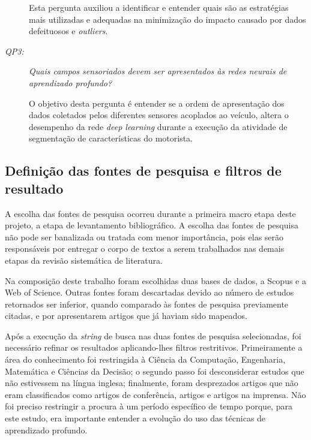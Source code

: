 \documentclass[10pt,journal,compsoc]{IEEEtran}
\begin{document}
\begin{description}
\begin{adjustwidth}{}{}
    Esta pergunta auxiliou a identificar e entender quais são as estratégias mais
    utilizadas e adequadas na minimização do impacto causado por dados defeituosos e \textit{outliers}.
  \end{adjustwidth}
    \vspace{0.3cm}
\item [\emph{QP3: }]\emph{Quais campos sensoriados devem ser
    apresentados às redes neurais de aprendizado profundo?}
    \vspace{0.15cm}
    \begin{adjustwidth}{}{}
      O objetivo desta pergunta é entender se a ordem de apresentação
      dos dados coletados pelos diferentes sensores acoplados ao
      veículo, altera o desempenho da rede \textit{deep learning} durante
      a execução da atividade de segmentação de características do motorista.
    \end{adjustwidth}
\end{description}

\subsection{Definição das fontes de pesquisa e filtros de resultado}
A escolha das fontes de pesquisa ocorreu durante a primeira macro
etapa deste projeto, a etapa de levantamento bibliográfico. A escolha
das fontes de pesquisa não pode ser banalizada ou tratada com menor
importância, pois elas serão responsáveis por entregar o corpo de
textos a serem trabalhados nas demais etapas da revisão sistemática de
literatura.

Na composição deste trabalho foram escolhidas duas bases de dados, a Scopus e a Web of
Science. Outras fontes foram descartadas devido ao número de estudos
retornados ser inferior, quando comparado às fontes de pesquisa previamente citadas, e por apresentarem artigos que já haviam
sido mapeados.

Após a execução da \textit{string} de busca nas duas fontes de
pesquisa selecionadas, foi necessário refinar os resultados aplicando-lhes
filtros restritivos. Primeiramente a área do conhecimento foi
restringida à Ciência da Computação, Engenharia, Matemática e Ciências
da Decisão; o
segundo passo foi desconsiderar estudos que não estivessem na língua
inglesa; finalmente, foram desprezados artigos que não eram
classificados como artigos de conferência, artigos e artigos na
imprensa. Não foi preciso restringir a procura à um período específico
de tempo porque, para este estudo, era importante entender a evolução
do uso das técnicas de aprendizado profundo.
\end{document}
